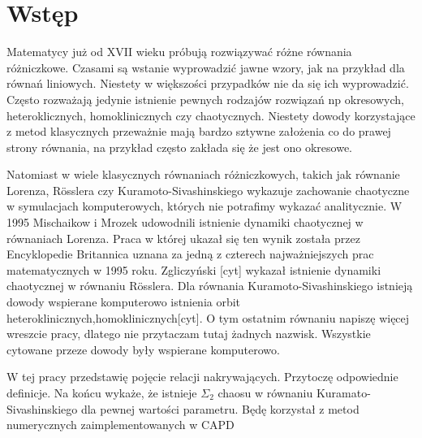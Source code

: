 \section{Wstęp}

Matematycy już od XVII wieku próbują rozwiązywać różne równania różniczkowe.
Czasami są wstanie wyprowadzić jawne wzory, jak na przykład dla równań liniowych. Niestety w większości
przypadków nie da się ich wyprowadzić.
Często rozważają jedynie istnienie pewnych rodzajów rozwiązań np okresowych, heteroklicznych,
homoklinicznych czy chaotycznych. Niestety dowody korzystające z metod klasycznych przeważnie mają bardzo 
sztywne założenia co do prawej strony równania, na przykład często zakłada się że jest ono okresowe.

Natomiast w wiele klasycznych równaniach różniczkowych, takich jak równanie Lorenza, R\"{o}sslera czy Kuramoto-Sivashinskiego wykazuje 
zachowanie chaotyczne w symulacjach komputerowych, których nie potrafimy wykazać analitycznie.
W 1995 Mischaikow i Mrozek \cite{MM} udowodnili istnienie dynamiki chaotycznej 
w równaniach Lorenza. Praca w której ukazał się ten wynik została przez Encyklopedie Britannica uznana za jedną z czterech najważniejszych 
prac matematycznych w 1995 roku. Zgliczyński [cyt] wykazał istnienie dynamiki chaotycznej w równaniu R\"{o}sslera.
Dla równania Kuramoto-Sivashinskiego istnieją dowody wspierane komputerowo istnienia 
orbit heteroklinicznych,homoklinicznych[cyt]. O tym ostatnim równaniu napiszę więcej wreszcie pracy, dlatego nie przytaczam tutaj żadnych nazwisk.
Wszystkie cytowane przeze dowody były wspierane komputerowo.

W tej pracy przedstawię pojęcie relacji nakrywających. Przytoczę odpowiednie definicje. Na końcu wykaże, że istnieje $ \Sigma_2 $ chaosu w równaniu Kuramato-Sivashinskiego dla 
pewnej wartości parametru. Będę korzystał z metod numerycznych zaimplementowanych w CAPD \cite{CAPD}















